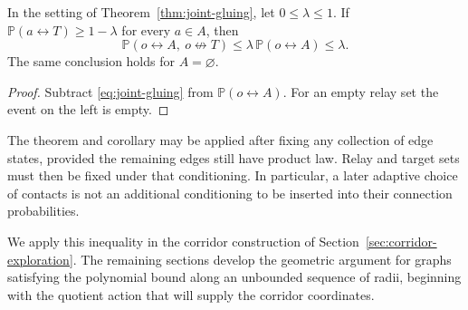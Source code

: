 \begin{corollary}
\label{cor:gluing-failure}
In the setting of Theorem~\ref{thm:joint-gluing}, let $0\le\lambda\le1$.
If $\mathbb P(a\leftrightarrow T)\ge1-\lambda$ for every $a\in A$, then
\[
 \mathbb P(o\leftrightarrow A,\ o\not\leftrightarrow T)
 \le\lambda\,\mathbb P(o\leftrightarrow A)\le\lambda.
\]
The same conclusion holds for $A=\varnothing$.
\end{corollary}

\begin{proof}
Subtract \eqref{eq:joint-gluing} from $\mathbb P(o\leftrightarrow A)$.
For an empty relay set the event on the left is empty.
\end{proof}

The theorem and corollary may be applied after fixing any collection of
edge states, provided the remaining edges still have product law.
Relay and target sets must then be fixed under that conditioning.
In particular, a later adaptive choice of contacts is not an additional
conditioning to be inserted into their connection probabilities.

We apply this inequality in the corridor construction of
Section~\ref{sec:corridor-exploration}. The remaining sections develop
the geometric argument for graphs satisfying the polynomial bound along
an unbounded sequence of radii, beginning with the quotient action that
will supply the corridor coordinates.
